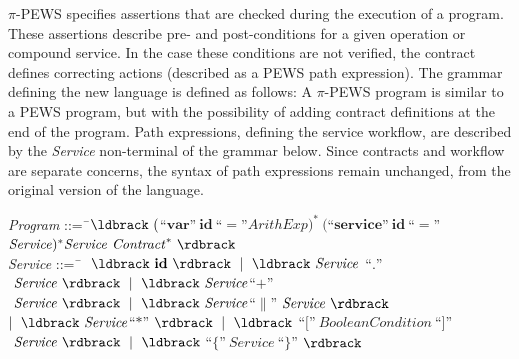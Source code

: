 $\pi$-PEWS specifies assertions that are checked during the execution of
a program. These assertions describe pre- and post-conditions for a given
operation or compound service. In the case these conditions are not verified,
the contract defines correcting actions (described as a PEWS path expression).
%
%
The grammar defining the new language is defined as follows:
A $\pi$-PEWS program is similar to a PEWS program, but with the possibility of adding contract definitions at the end of the program.
Path expressions, defining the service workflow, are described by the \textit{Service} non-terminal of the grammar below. 
Since contracts and workflow are separate concerns, the syntax of path expressions remain unchanged, from the original version of the language.
\begin{small}
\begin{tabbing}
\reg \textit{Program} ::=\=  \ $\ldbrack\ ($``$\mathbf{var}$''$\ \mathbf{id}\ $``$=$''$ \mathit{ArithExp} )^*  \ ($``$\mathbf{service}$''$\ \mathbf{id}\ $``$=$''$ \mathit{Service})^* %
                                               \mathit{Service}\ \mathit{Contract}^ *\ \rdbrack$\\[1.5mm] 
\reg \textit{Service} ::=\=  \ $\ 	\ \ldbrack\  \mathbf{id} \ \rdbrack\ 
                                              \mid\ \ldbrack\ \mathit{Service}\ $``$.$''$\ \mathit{Service} \ \rdbrack\ 
                                              \mid\ \ldbrack\ \mathit{Service} $``$+$''$\ \mathit{Service} \ \rdbrack\ 
                                              \mid\ \ldbrack\  \mathit{Service} $``$\|$''$\ \mathit{Service} \ \rdbrack\ $\\ \>$
                                              \mid\ \ldbrack\  \mathit{Service}$``$*$''$\ \rdbrack\ 
                                              \mid\ \ldbrack\ $``$[$''$\ \mathit{BooleanCondition}\ $``$]$''$ \ \mathit{Service}\ \rdbrack\ 
                                              \mid\ \ldbrack\ $``$\{$''$\ 
                                              \mathit{Service}\ $``$\}$''$ \
                                              \rdbrack\ $\\[-3mm]
\end{tabbing}
\end{small}

